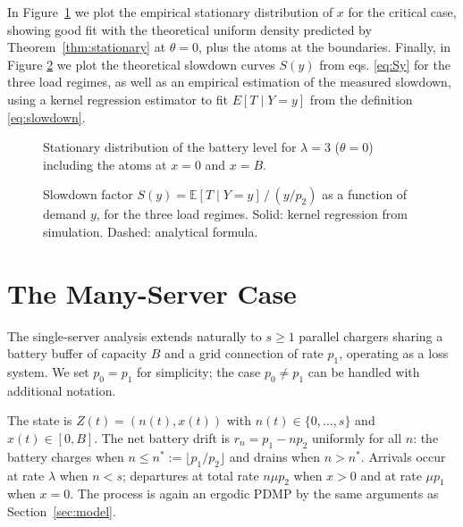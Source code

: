 \documentclass{sig-alternate-per-modified}
\renewcommand{\leq}{\leqslant}
\renewcommand{\geq}{\geqslant}
\begin{document}
In Figure~\ref{fig:cdf} we plot the empirical stationary distribution of $x$ for the critical case, showing good fit with the theoretical uniform density predicted by Theorem~\ref{thm:stationary} at $\theta=0$, plus the atoms at the boundaries. Finally, in Figure \ref{fig:slowdown} we plot the theoretical slowdown curves $S(y)$ from eqs. \eqref{eq:Sy} for the three load regimes, as well as an empirical estimation of the measured slowdown, using a kernel regression estimator to fit $E[T \mid Y=y]$ from the definition \eqref{eq:slowdown}.

\begin{figure}[t]
  \centering
  
  \caption{Stationary distribution of the battery level for $\lambda=3$
    ($\theta=0$) including the atoms at $x=0$ and $x=B$.}
  \label{fig:cdf}
\end{figure}


\begin{figure}[t]
  \centering
  
  \caption{Slowdown factor $S(y) = \mathbb{E}[T \mid Y=y]\,/\,(y/p_2)$ as a
    function of demand $y$, for the three load regimes.
    Solid: kernel regression from simulation. Dashed: analytical formula.}
  \label{fig:slowdown}
\end{figure}

\section{The Many-Server Case}
\label{sec:multiserver}

The single-server analysis extends naturally to $s \geq 1$ parallel chargers sharing
a battery buffer of capacity $B$ and a grid connection of rate $p_1$, operating as a
loss system. We set $p_0 = p_1$ for simplicity; the case $p_0 \neq p_1$ can be handled
with additional notation.

The state is $Z(t) = (n(t), x(t))$ with $n(t) \in \{0,\ldots,s\}$ and $x(t) \in [0,B]$.
The net battery drift is $r_n = p_1 - np_2$ uniformly for all $n$:
the battery charges when $n \leq n^* := \lfloor p_1/p_2 \rfloor$ and drains when
$n > n^*$. Arrivals occur at rate $\lambda$ when $n<s$; departures at total rate
$n\mu p_2$ when $x>0$ and at rate $\mu p_1$ when $x=0$. The process is again an
ergodic PDMP by the same arguments as Section~\ref{sec:model}.
\end{document}
